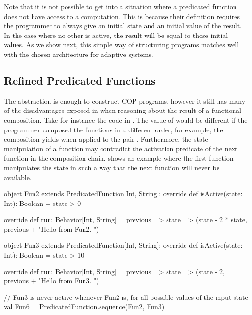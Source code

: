 Note that it is not possible to get into a situation where a predicated function does not have access to
a  computation. This is because their definition requires the programmer to always
give an initial state and an initial value of the result. In the case where no other  is 
active, the result will be equal to those initial values. As we show next, this simple 
way of structuring programs matches well with the chosen architecture for adaptive systems.


\subsection{Refined Predicated Functions}
\label{sec:refined-predicated-functions}

The  abstraction is enough to construct \ac{COP} programs, however it still 
has many of the disadvantages exposed in  when reasoning about 
the result of a functional composition. Take for instance the code in
. The value of  would be different if the 
programmer composed the functions in a different order; for example, the composition 
 yields  when applied to the pair 
 . Furthermore, the state manipulation of a function may 
contradict the activation predicate of the next function in the composition chain.
 shows an example where the first function 
manipulates the state in such a way that the next function will never be available.

\begin{scala}[label=lst:predicated-function-contradictory-composition, caption=Contradictory composition example]
object Fun2 extends PredicatedFunction[Int, String]:
  override def isActive(state: Int): Boolean =
    state > 0

  override def run: Behavior[Int, String] = previous => state =>
    (state - 2 * state, previous + "Hello from Fun2. ")

object Fun3 extends PredicatedFunction[Int, String]:
  override def isActive(state: Int): Boolean =
    state > 10

  override def run: Behavior[Int, String] = previous => state =>
    (state - 2, previous + "Hello from Fun3. ")

// Fun3 is never active whenever Fun2 is, for all possible values of the input state
val Fun6 = PredicatedFunction.sequence(Fun2, Fun3)
\end{scala}

